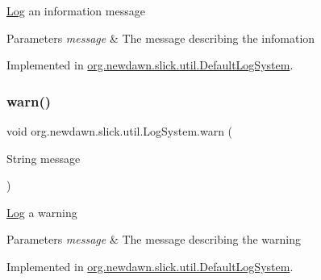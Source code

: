 \mbox{\hyperlink{classorg_1_1newdawn_1_1slick_1_1util_1_1_log}{Log}} an information message


\begin{DoxyParams}{Parameters}
{\em message} & The message describing the infomation \\
\hline
\end{DoxyParams}


Implemented in \mbox{\hyperlink{classorg_1_1newdawn_1_1slick_1_1util_1_1_default_log_system_a07edffad8b8eb3bd937f82110621b761}{org.\+newdawn.\+slick.\+util.\+Default\+Log\+System}}.

\mbox{\label{interfaceorg_1_1newdawn_1_1slick_1_1util_1_1_log_system_a4c4f5a96667389bbca64c86f63272b7d}} 
\subsubsection{\texorpdfstring{warn()}{warn()}\hspace{0.1cm}{\footnotesize\ttfamily [1/2]}}
{\footnotesize\ttfamily void org.\+newdawn.\+slick.\+util.\+Log\+System.\+warn (\begin{DoxyParamCaption}\item[{String}]{message }\end{DoxyParamCaption})}

\mbox{\hyperlink{classorg_1_1newdawn_1_1slick_1_1util_1_1_log}{Log}} a warning


\begin{DoxyParams}{Parameters}
{\em message} & The message describing the warning \\
\hline
\end{DoxyParams}


Implemented in \mbox{\hyperlink{classorg_1_1newdawn_1_1slick_1_1util_1_1_default_log_system_a43bae56fa5d877bbdee7a413e3699f63}{org.\+newdawn.\+slick.\+util.\+Default\+Log\+System}}.

\mbox{\label{interfaceorg_1_1newdawn_1_1slick_1_1util_1_1_log_system_a21c1d0fd6928a9973d9727b521bf9352}} 
